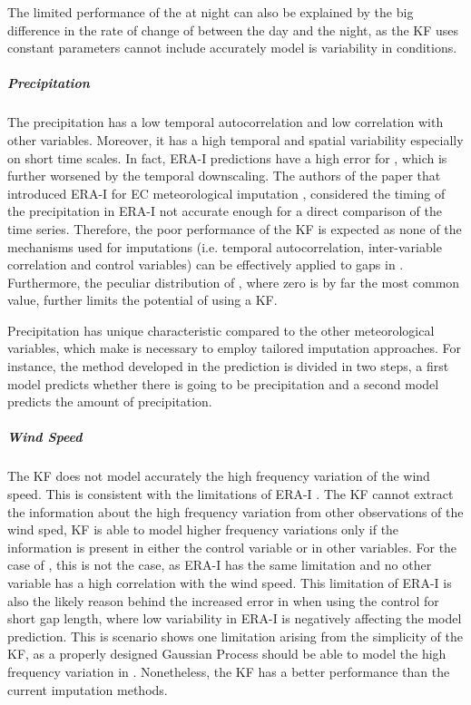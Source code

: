 \documentclass{article}
\begin{document}
The limited performance of the  at night can also be explained by the big difference in the rate of change of  between the day and the night, as the KF uses constant parameters cannot include accurately model is variability in conditions.

\subparagraph{Precipitation} The precipitation has a low temporal autocorrelation and low correlation with other variables. Moreover, it has a high temporal and spatial variability \cite{mital_sequential_2020} especially on short time scales. In fact, ERA-I predictions have a high error for , which is further worsened by the temporal downscaling. The authors of the paper that introduced ERA-I for EC meteorological imputation \cite{vuichard_filling_2015}, considered the timing of the precipitation in ERA-I not accurate enough for a direct comparison of the time series.
Therefore, the poor performance of the KF is expected as none of the mechanisms used for imputations (i.e. temporal autocorrelation, inter-variable correlation and control variables) can be effectively applied to gaps in . Furthermore, the peculiar distribution of , where zero is by far the most common value, further limits the potential of using a KF.

Precipitation has unique characteristic compared to the other meteorological variables, which make is necessary to employ tailored imputation approaches. For instance, the method developed in \cite{chivers_imputation_2020} the prediction is divided in two steps, a first model predicts whether there is going to be precipitation and a second model predicts the amount of precipitation. 

\subparagraph{Wind Speed} The KF does not model accurately the high frequency variation of the wind speed. This is consistent with the limitations of ERA-I \cite{vuichard_filling_2015}. The KF cannot extract the information about the high frequency variation from other observations of the wind sped, KF is able to model higher frequency variations only if the information is present in either the control variable or in other variables. For the case of , this is not the case, as ERA-I has the same limitation and no other variable has a high correlation with the wind speed. This limitation of ERA-I is also the likely reason behind the increased error in  when using the control for short gap length, where low variability in ERA-I is negatively affecting the model prediction.
This is scenario shows one limitation arising from the simplicity of the KF, as a properly designed Gaussian Process should be able to model the high frequency variation in . Nonetheless, the KF has a better performance than the current imputation methods. 
\end{document}
